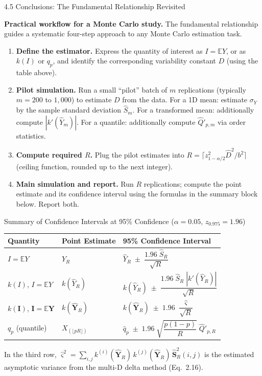 \documentclass[aspectratio=169,10pt]{beamer}
\begin{document}
\begin{frame}[allowframebreaks]{4.5 Conclusions: The Fundamental Relationship Revisited}
\framebreak

\textbf{Practical workflow for a Monte Carlo study.}
The fundamental relationship guides a systematic four-step approach to any
Monte Carlo estimation task.

\begin{enumerate}
  \item \textbf{Define the estimator.}  Express the quantity of interest as
    $I = \mathbb{E}Y$, or as $k(I)$ or $q_p$, and identify the corresponding
    variability constant $D$ (using the table above).

  \item \textbf{Pilot simulation.}  Run a small ``pilot'' batch of $m$ replications
    (typically $m = 200$ to $1{,}000$) to estimate $D$ from the data.
    For a 1D mean: estimate $\sigma_Y$ by the sample standard deviation $\hat{S}_m$.
    For a transformed mean: additionally compute $|k'(\hat{Y}_m)|$.
    For a quantile: additionally compute $\hat{Q}'_{p,m}$ via order statistics.

  \item \textbf{Compute required $R$.}  Plug the pilot estimates into
    $R = \lceil z_{1-\alpha/2}^2 \hat{D}^2/b^2 \rceil$ (ceiling function, rounded
    up to the next integer).

  \item \textbf{Main simulation and report.}  Run $R$ replications; compute the
    point estimate and its confidence interval using the formulas in the summary
    block below.  Report both.
\end{enumerate}

\begin{block}{Summary of Confidence Intervals at 95\% Confidence ($\alpha = 0.05$, $z_{0.975} = 1.96$)}
  \begin{center}
    \renewcommand{\arraystretch}{1.8}
    \begin{tabular}{lll}
      \toprule
      Quantity & Point Estimate & 95\% Confidence Interval \\
      \midrule
      $I = \mathbb{E}Y$
        & $\hat{Y}_R$
        & $\hat{Y}_R \;\pm\; \dfrac{1.96\;\hat{S}_R}{\sqrt{R}}$ \\
      $k(I)$, $I = \mathbb{E}Y$
        & $k(\hat{Y}_R)$
        & $k(\hat{Y}_R) \;\pm\; \dfrac{1.96\;\hat{S}_R\;|k'(\hat{Y}_R)|}{\sqrt{R}}$ \\
      $k(\mathbf{I})$, $\mathbf{I} = \mathbb{E}\mathbf{Y}$
        & $k(\hat{\mathbf{Y}}_R)$
        & $k(\hat{\mathbf{Y}}_R) \;\pm\; 1.96\;\dfrac{\hat{\varsigma}}{\sqrt{R}}$ \\
      $q_p$ (quantile)
        & $X_{(\lfloor pR \rfloor)}$
        & $\hat{q}_p \;\pm\; 1.96\;\sqrt{\dfrac{p(1-p)}{R}}\;\hat{Q}'_{p,R}$ \\
      \bottomrule
    \end{tabular}
  \end{center}
  In the third row, $\hat{\varsigma}^2 = \sum_{i,j} k^{(i)}(\hat{\mathbf{Y}}_R)
  \,k^{(j)}(\hat{\mathbf{Y}}_R)\,\hat{\mathbf{S}}_R^2(i,j)$
  is the estimated asymptotic variance from the multi-D delta method (Eq.\ 2.16).
\end{block}


\end{frame}
\end{document}
